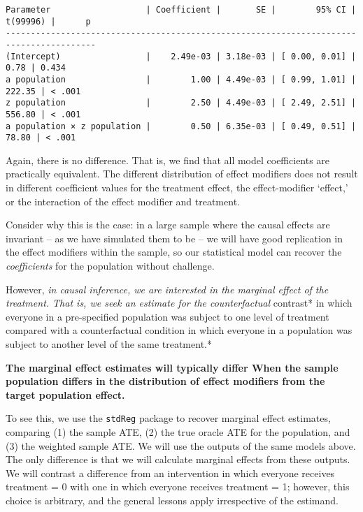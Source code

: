 \documentclass[
  single column]{article}
\begin{document}
\begin{verbatim}
Parameter                   | Coefficient |       SE |        95% CI | t(99996) |      p
----------------------------------------------------------------------------------------
(Intercept)                 |    2.49e-03 | 3.18e-03 | [ 0.00, 0.01] |     0.78 | 0.434 
a population                |        1.00 | 4.49e-03 | [ 0.99, 1.01] |   222.35 | < .001
z population                |        2.50 | 4.49e-03 | [ 2.49, 2.51] |   556.80 | < .001
a population × z population |        0.50 | 6.35e-03 | [ 0.49, 0.51] |    78.80 | < .001
\end{verbatim}

Again, there is no difference. That is, we find that all model
coefficients are practically equivalent. The different distribution of
effect modifiers does not result in different coefficient values for the
treatment effect, the effect-modifier `effect,' or the interaction of
the effect modifier and treatment.

Consider why this is the case: in a large sample where the causal
effects are invariant -- as we have simulated them to be -- we will have
good replication in the effect modifiers within the sample, so our
statistical model can recover the \emph{coefficients} for the population
without challenge.

However, \emph{in causal inference, we are interested in the marginal
effect of the treatment. That is, we seek an estimate for the
counterfactual }contrast* in which everyone in a pre-specified
population was subject to one level of treatment compared with a
counterfactual condition in which everyone in a population was subject
to another level of the same treatment.*

\textbf{The marginal effect estimates will typically differ When the
sample population differs in the distribution of effect modifiers from
the target population effect.}

To see this, we use the \texttt{stdReg} package to recover marginal
effect estimates, comparing (1) the sample ATE, (2) the true oracle ATE
for the population, and (3) the weighted sample ATE. We will use the
outputs of the same models above. The only difference is that we will
calculate marginal effects from these outputs. We will contrast a
difference from an intervention in which everyone receives treatment = 0
with one in which everyone receives treatment = 1; however, this choice
is arbitrary, and the general lessons apply irrespective of the
estimand.
\end{document}

